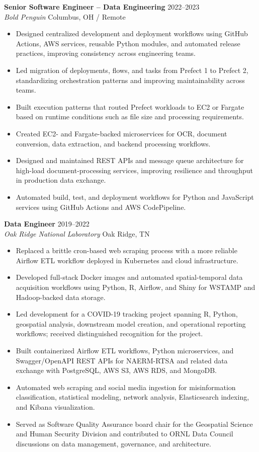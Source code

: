 \documentclass[10pt]{article}
\newcommand{\role}[4]{%
    \textbf{#1} \hfill #4\\
    \textit{#2} \hfill #3
}
\begin{document}
\role{Senior Software Engineer -- Data Engineering}{Bold Penguin}{Columbus, OH / Remote}{2022--2023}
\begin{itemize}
    \item Designed centralized development and deployment workflows using GitHub Actions, AWS services, reusable Python modules, and automated release practices, improving consistency across engineering teams.
    \item Led migration of deployments, flows, and tasks from Prefect 1 to Prefect 2, standardizing orchestration patterns and improving maintainability across teams.
    \item Built execution patterns that routed Prefect workloads to EC2 or Fargate based on runtime conditions such as file size and processing requirements.
    \item Created EC2- and Fargate-backed microservices for OCR, document conversion, data extraction, and backend processing workflows.
    \item Designed and maintained REST APIs and message queue architecture for high-load document-processing services, improving resilience and throughput in production data exchange.
    \item Automated build, test, and deployment workflows for Python and JavaScript services using GitHub Actions and AWS CodePipeline.
\end{itemize}

\role{Data Engineer}{Oak Ridge National Laboratory}{Oak Ridge, TN}{2019--2022}
\begin{itemize}
    \item Replaced a brittle cron-based web scraping process with a more reliable Airflow ETL workflow deployed in Kubernetes and cloud infrastructure.
    \item Developed full-stack Docker images and automated spatial-temporal data acquisition workflows using Python, R, Airflow, and Shiny for WSTAMP and Hadoop-backed data storage.
    \item Led development for a COVID-19 tracking project spanning R, Python, geospatial analysis, downstream model creation, and operational reporting workflows; received distinguished recognition for the project.
    \item Built containerized Airflow ETL workflows, Python microservices, and Swagger/OpenAPI REST APIs for NAERM-RTSA and related data exchange with PostgreSQL, AWS S3, AWS RDS, and MongoDB.
    \item Automated web scraping and social media ingestion for misinformation classification, statistical modeling, network analysis, Elasticsearch indexing, and Kibana visualization.
    \item Served as Software Quality Assurance board chair for the Geospatial Science and Human Security Division and contributed to ORNL Data Council discussions on data management, governance, and architecture.
\end{itemize}
\end{document}

